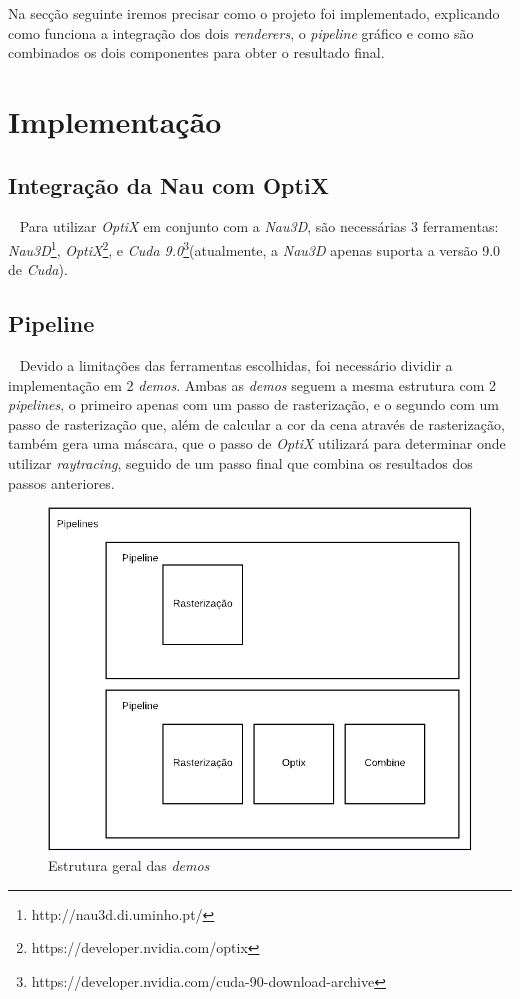 \documentclass[10pt]{article}
\begin{document}
Na secção seguinte iremos precisar como o projeto foi implementado, explicando como funciona a integração dos dois \textit{renderers}, o \textit{pipeline} gráfico e como são combinados os dois componentes para obter o resultado final.




\section{Implementação} \label{sec:imp}

\subsection{Integração da Nau com OptiX}~
Para utilizar \textit{OptiX} em conjunto com a \textit{Nau3D}, são necessárias 3 ferramentas: \textit{Nau3D}\footnote{http://nau3d.di.uminho.pt/}, \textit{OptiX}\footnote{https://developer.nvidia.com/optix}, e \textit{Cuda 9.0}\footnote{https://developer.nvidia.com/cuda-90-download-archive}(atualmente, a \textit{Nau3D} apenas suporta a versão 9.0 de \textit{Cuda}).

\subsection{Pipeline}~
Devido a limitações das ferramentas escolhidas, foi necessário dividir a implementação em 2 \textit{demos}. Ambas as \textit{demos} seguem a mesma estrutura com 2 \textit{pipelines}, o primeiro apenas com um passo de rasterização, e o segundo com um passo de rasterização que, além de calcular a cor da cena através de rasterização, também gera uma máscara, que o passo de \textit{OptiX} utilizará para determinar onde utilizar \textit{raytracing}, seguido de um passo final que combina os resultados dos passos anteriores.

\begin{figure}[H]
    \centering
    \includegraphics[width=4.7in]{estrutura.png}
    \caption{Estrutura geral das \textit{demos}}
\end{figure}
\end{document}

